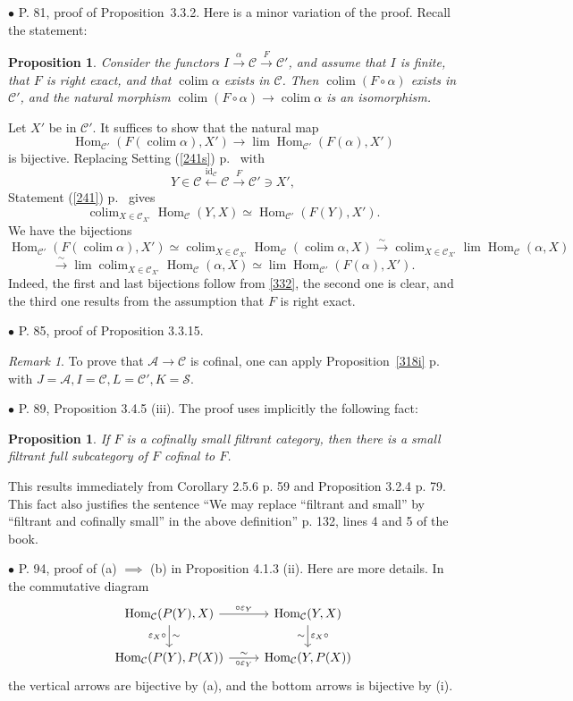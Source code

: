 \documentclass[12pt]{article}
\newtheorem{prop}[thm]{Proposition}
\theoremstyle{remark}%
\newtheorem{rk}[thm]{Remark}%
\newcommand{\bu}{\bullet}
\newcommand{\n}{\noindent}
\newcommand{\cc}{\mathcal}
\newcommand{\A}{\mathcal A}
\newcommand{\C}{\mathcal C}
\newcommand{\e}{\varepsilon}
\newcommand{\xr}{\xrightarrow}
\newcommand{\be}{\begin{equation}}
\newcommand{\ee}{\end{equation}}
\newcommand{\pr}{Proposition}
\DeclareMathOperator*{\co}{colim}
\DeclareMathOperator{\id}{id}
\DeclareMathOperator{\h}{Hom}
\begin{document}
\n$\bu$ P. 81, proof of \pr\ 3.3.2. Here is a minor variation of the proof. Recall the statement: 
% 
\begin{prop} 
% 
Consider the functors $I\xrightarrow\alpha\C\xrightarrow F\C'$, and assume that $I$ is finite, that $F$ is right exact, and that $\co\alpha$ exists in $\C$. Then $\co(F\circ\alpha)$ exists in $\C'$, and the natural morphism $\co(F\circ\alpha)\to\co\alpha$ is an isomorphism. 
%
\end{prop} 
% 
\n{\em Proof.} Let $X'$ be in $\C'$. It suffices to show that the natural map  
$$
\h_{\C'}(F(\co\alpha),X')\to\lim\h_{\C'}(F(\alpha),X')
$$ 
% 
is bijective. Replacing Setting (\ref{241s}) p.~\pageref{241s} with 
$$
Y\in\C\xleftarrow{\id_\C}\C\xrightarrow{F}\C'\ni X', 
$$ 
Statement (\ref{241}) p.~\pageref{241} gives 
% 
\be\label{332} 
\co_{X\in\C_{X'}}\h_\C(Y,X)\simeq\h_{\C'}(F(Y),X').  
\ee 
% 
We have the bijections 
$$ 
\h_{\C'}(F(\co\alpha),X')\simeq\co_{X\in\C_{X'}}\h_\C(\co\alpha,X)\xr\sim\co_{X\in\C_{X'}}\lim\h_\C(\alpha,X) 
$$ 
$$
\xr\sim\lim\co_{X\in\C_{X'}}\h_\C(\alpha,X)\simeq\lim\h_{\C'}(F(\alpha),X'). 
$$ 
Indeed, the first and last bijections follow from \eqref{332}, the second one is clear, and the third one results from the assumption that $F$ is right exact. 


\n$\bu$ P. 85, proof of Proposition 3.3.15. 
%
\begin{rk}\label{3315}  
% 
To prove that $\A\to\C$ is cofinal, one can apply \pr\ \ref{318i} p.~\pageref{318i} with $J=\A,I=\C,L=\C',K=\cc S$. 
%
\end{rk} 


\n$\bu$ P. 89, Proposition 3.4.5 (iii). The proof uses implicitly the following fact: 

\begin{prop}\label{355} 
If $F$ is a cofinally small filtrant category, then there is a small \emph{filtrant} full subcategory of $F$ cofinal to $F$. 
\end{prop}

This results immediately from Corollary 2.5.6 p. 59 and Proposition 3.2.4 p. 79. This fact also justifies the sentence ``We may replace ``filtrant and small'' by ``filtrant and cofinally small'' in the above definition'' p. 132, lines 4 and 5 of the book.


\n$\bu$ P. 94, proof of (a) $\implies$ (b) in Proposition 4.1.3 (ii). Here are more details. In the commutative diagram 
$$
\begin{tikzcd}
\h_\C(P(Y),X)\ar{d}{\sim}[swap]{\e_X\circ}\ar{r}{\circ\e_Y}&\h_\C(Y,X)\ar{d}{\e_X\circ}[swap]{\sim}\\ 
\h_\C(P(Y),P(X))\ar{r}[swap]{\circ\e_Y}{\sim}&\h_\C(Y,P(X))
\end{tikzcd}
$$ 
the vertical arrows are bijective by (a), and the bottom arrows is bijective by (i). 
\end{document}
